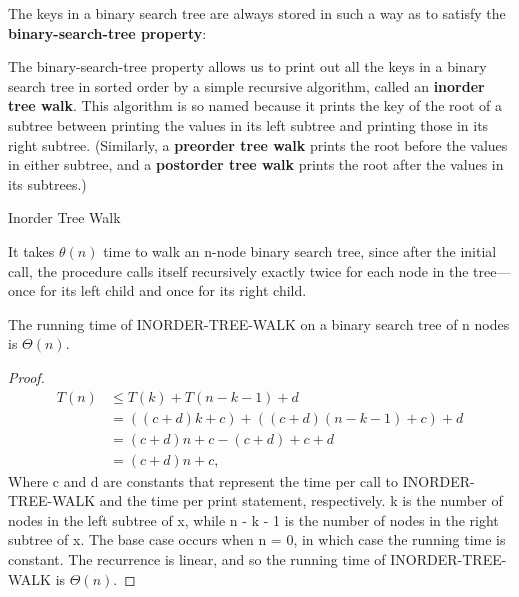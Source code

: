 The keys in a binary search tree are always stored in such a way as to satisfy the
\textbf{binary-search-tree property}:


The binary-search-tree property allows us to print out all the keys in a binary
search tree in sorted order by a simple recursive algorithm, called an \textbf{inorder tree
walk}. This algorithm is so named because it prints the key of the root of a subtree
between printing the values in its left subtree and printing those in its right subtree.
(Similarly, a \textbf{preorder tree walk} prints the root before the values in either subtree,
and a \textbf{postorder tree walk} prints the root after the values in its subtrees.)

\begin{algorithm}
    \caption{Inorder Tree Walk}
\end{algorithm}

It takes $\theta(n)$ time to walk an n-node binary search tree, since after the initial call, the procedure calls itself recursively exactly twice for each node in the
tree—once for its left child and once for its right child.

\newtheorem{binary search}{theorem}
\begin{theorem}
    The running time of INORDER-TREE-WALK on a binary search tree of n nodes is $\Theta(n)$.
\end{theorem}

\begin{proof}
    \begin{align*}
    T(n) &\leq T(k) + T(n-k-1) + d \\
    &= ((c + d)k + c) + ((c + d)(n - k - 1) + c) + d \\
    &= (c + d)n + c - (c + d) + c + d \\
    &= (c + d)n + c,
    \end{align*}
    Where c and d are constants that represent the time per call to INORDER-TREE-WALK and the time per print statement, respectively.  k is the number of nodes in the left subtree of x, while n - k - 1 is the number of nodes in the right subtree of x. The base case occurs when n = 0, in which case the running time is constant. The recurrence is linear, and so the running time of INORDER-TREE-WALK is $\Theta(n)$.
\end{proof}
\newpage
